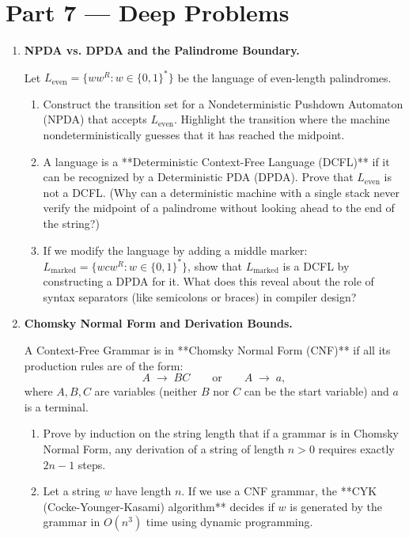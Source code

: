 \documentclass[12pt, a4paper]{book}
\begin{document}
\newpage

\section{Part 7 --- Deep Problems}

\begin{deepbox}
\begin{enumerate}[label=\textbf{D\arabic*.}]
  \item \textbf{NPDA vs. DPDA and the Palindrome Boundary.}
  
        Let $L_{\text{even}} = \{w w^R : w \in \{0,1\}^*\}$ be the language of even-length palindromes.
        \begin{enumerate}[label=(\alph*)]
          \item Construct the transition set for a Nondeterministic Pushdown Automaton (NPDA) that accepts $L_{\text{even}}$.
                Highlight the transition where the machine nondeterministically guesses that it has reached the midpoint.
          \item A language is a **Deterministic Context-Free Language (DCFL)** if it can be recognized by a Deterministic PDA (DPDA).
                Prove that $L_{\text{even}}$ is not a DCFL. (Why can a deterministic machine with a single stack never verify the midpoint of a palindrome without looking ahead to the end of the string?)
          \item If we modify the language by adding a middle marker: $L_{\text{marked}} = \{w c w^R : w \in \{0, 1\}^*\}$, show that $L_{\text{marked}}$ is a DCFL by constructing a DPDA for it.
                What does this reveal about the role of syntax separators (like semicolons or braces) in compiler design?
        \end{enumerate}

  \item \textbf{Chomsky Normal Form and Derivation Bounds.}
  
        A Context-Free Grammar is in **Chomsky Normal Form (CNF)** if all its production rules are of the form:
        \[
          A \;\to\; B C \qquad \text{or} \qquad A \;\to\; a,
        \]
        where $A, B, C$ are variables (neither $B$ nor $C$ can be the start variable) and $a$ is a terminal.
        
        \begin{enumerate}[label=(\alph*)]
          \item Prove by induction on the string length that if a grammar is in Chomsky Normal Form, any derivation of a string of length $n > 0$ requires exactly $2n - 1$ steps.
          \item Let a string $w$ have length $n$.
                If we use a CNF grammar, the **CYK (Cocke-Younger-Kasami) algorithm** decides if $w$ is generated by the grammar in $O(n^3)$ time using dynamic programming.
                

\end{enumerate}
\end{enumerate}
\end{deepbox}
\end{document}
